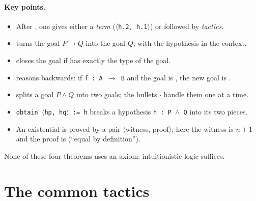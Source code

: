\paragraph{Key points.}
\begin{itemize}
\item After \lean{:=}, one gives either a \emph{term} (\texttt{$\langle$h.2, h.1$\rangle$}) or  followed by \emph{tactics}.
\item {} turns the goal $P\to Q$ into the goal $Q$, with the hypothesis  in the context.
\item {} closes the goal if  has exactly the type of the goal.
\item {} reasons backwards: if \texttt{f : A $\to$ B} and the goal is , the new goal is .
\item {} splits a goal $P\wedge Q$ into two goals; the bullets \texttt{$\cdot$} handle them one at a time.
\item \texttt{obtain $\langle$hp, hq$\rangle$ := h} breaks a hypothesis \texttt{h : P $\wedge$ Q} into its two pieces.
\item An existential is proved by a pair $\langle$witness, proof$\rangle$; here the witness is $n+1$ and the proof is
 (``equal by definition'').
\end{itemize}
None of these four theorems uses an axiom: intuitionistic logic suffices.

\section{The common tactics}\label{appC:sec:tactiques}

